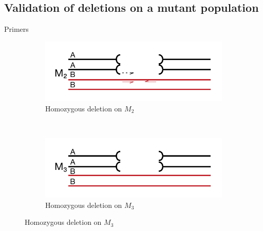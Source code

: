 \subsection{Validation of deletions on a mutant population}
Primers
\begin{figure}
    \centering
    \begin{subfigure}[b]{0.4\textwidth}
        \includegraphics[width=1\textwidth]{PolyMarker/Figures/deletions/homM2.pdf}
        \caption{Homozygous deletion on $M_{2}$}
        \label{fig:poly:homM2}
    \end{subfigure}
    ~ %
    \begin{subfigure}[b]{0.4\textwidth}
        \includegraphics[width=1\textwidth]{PolyMarker/Figures/deletions/homM3.pdf} 
        \caption{Homozygous deletion on  $M_{3}$}
        \label{fig:poly:homM3}
    \end{subfigure}
    

\end{figure}
